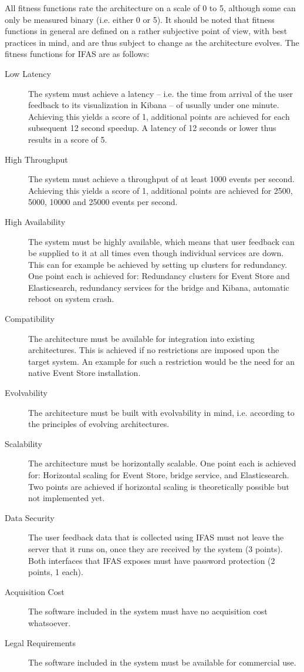 All fitness functions rate the architecture on a scale of 0 to 5, although some can only be measured binary (i.e. either 0 or 5).
It should be noted that fitness functions in general are defined on a rather subjective point of view, with best practices in mind, and are thus subject to change as the architecture evolves.
The fitness functions for \ac{IFAS} are as follows:

\begin{description}
\item[Low Latency] The system must achieve a latency -- i.e. the time from arrival of the user feedback to its visualization in Kibana -- of usually under one minute.
Achieving this yields a score of 1, additional points are achieved for each subsequent 12 second speedup.
A latency of 12 seconds or lower thus results in a score of 5.
\item[High Throughput] The system must achieve a throughput of at least 1000 events per second.
Achieving this yields a score of 1, additional points are achieved for 2500, 5000, 10000 and 25000 events per second.
\item[High Availability] The system must be highly available, which means that user feedback can be supplied to it at all times even though individual services are down.
This can for example be achieved by setting up clusters for redundancy.
One point each is achieved for: Redundancy clusters for Event Store and Elasticsearch, redundancy services for the bridge and Kibana, automatic reboot on system crash. 
\item[Compatibility] The architecture must be available for integration into existing architectures.
This is achieved if no restrictions are imposed upon the target system.
An example for such a restriction would be the need for an native Event Store installation.
\item[Evolvability] The architecture must be built with evolvability in mind, i.e. according to the principles of evolving architectures.
\item[Scalability] The architecture must be horizontally scalable.
One point each is achieved for: Horizontal scaling for Event Store, bridge service, and Elasticsearch.
Two points are achieved if horizontal scaling is theoretically possible but not implemented yet.
\item[Data Security] The user feedback data that is collected using \ac{IFAS} must not leave the server that it runs on, once they are received by the system (3 points).
Both interfaces that \ac{IFAS} exposes must have password protection (2 points, 1 each).
\item[Acquisition Cost] The software included in the system must have no acquisition cost whatsoever.
\item[Legal Requirements] The software included in the system must be available for commercial use.
\end{description}


